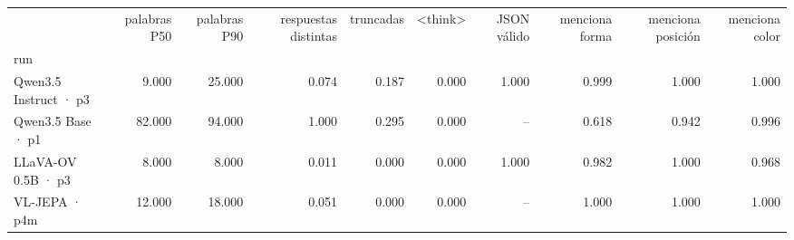 \begin{tabular}{lrrrrrrrrr}
\toprule
 & palabras P50 & palabras P90 & respuestas distintas & truncadas & <think> & JSON válido & menciona forma & menciona posición & menciona color \\
run &  &  &  &  &  &  &  &  &  \\
\midrule
Qwen3.5 Instruct · p3 & 9.000 & 25.000 & 0.074 & 0.187 & 0.000 & 1.000 & 0.999 & 1.000 & 1.000 \\
Qwen3.5 Base · p1 & 82.000 & 94.000 & 1.000 & 0.295 & 0.000 & -- & 0.618 & 0.942 & 0.996 \\
LLaVA-OV 0.5B · p3 & 8.000 & 8.000 & 0.011 & 0.000 & 0.000 & 1.000 & 0.982 & 1.000 & 0.968 \\
VL-JEPA · p4m & 12.000 & 18.000 & 0.051 & 0.000 & 0.000 & -- & 1.000 & 1.000 & 1.000 \\
\bottomrule
\end{tabular}
